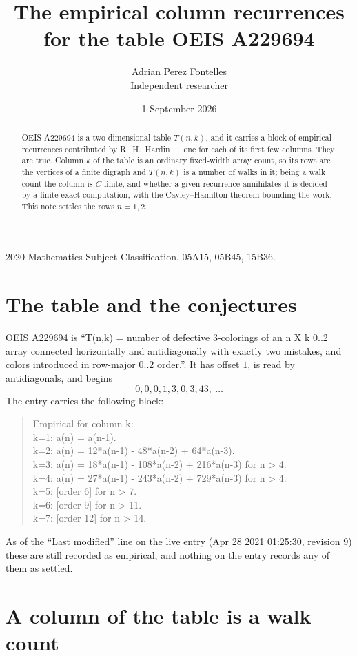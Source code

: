 \documentclass[11pt,a4paper]{article}
\title{The empirical column recurrences for the table OEIS A229694}
\author{Adrian Perez Fontelles\\ \small Independent researcher}
\date{1 September 2026}
\theoremstyle{plain}
\theoremstyle{definition}
\begin{document}
\maketitle

\begin{abstract}
OEIS A229694 is a two-dimensional table $T(n,k)$, and it carries a block of empirical
recurrences contributed by R.~H.~Hardin --- one for each of its first few columns. They are
true. Column $k$ of the table is an ordinary fixed-width array count, so its rows are the
vertices of a finite digraph and $T(n,k)$ is a number of walks in it; being a walk count the
column is $C$-finite, and whether a given recurrence annihilates it is decided by a finite
exact computation, with the Cayley--Hamilton theorem bounding the work. This note settles the rows $n=1, 2$.
\end{abstract}

\noindent\small 2020 Mathematics Subject Classification. 05A15, 05B45, 15B36.\normalsize

\section{The table and the conjectures}

OEIS A229694 is ``T(n,k) = number of defective 3-colorings of an n X k 0..2 array connected horizontally and antidiagonally with exactly two mistakes, and colors introduced in row-major 0..2 order.''. It has offset $1$, is
read by antidiagonals, and begins
\[
0, 0, 0, 1, 3, 0, 3, 43,\ \dots
\]
The entry carries the following block:
\begin{quote}\small
Empirical for column k:\\
k=1: a(n) = a(n-1).\\
k=2: a(n) = 12*a(n-1) - 48*a(n-2) + 64*a(n-3).\\
k=3: a(n) = 18*a(n-1) - 108*a(n-2) + 216*a(n-3) for n > 4.\\
k=4: a(n) = 27*a(n-1) - 243*a(n-2) + 729*a(n-3) for n > 4.\\
k=5: [order 6] for n > 7.\\
k=6: [order 9] for n > 11.\\
k=7: [order 12] for n > 14.\\
\end{quote}
As of the ``Last modified'' line on the live entry (Apr 28 2021 01:25:30, revision 9) these are still
recorded as empirical, and nothing on the entry records any of them as settled.

\section{A column of the table is a walk count}
\end{document}
